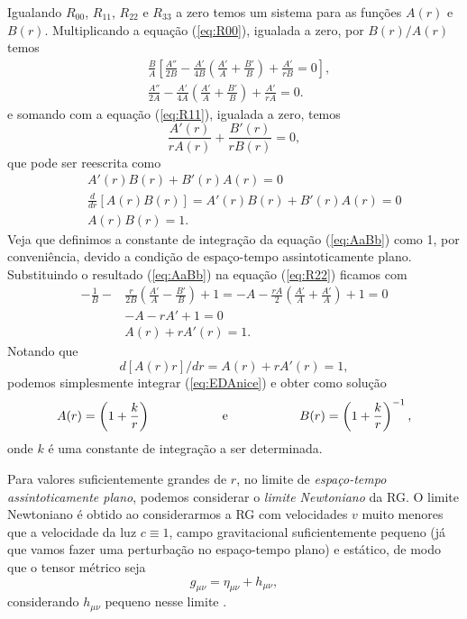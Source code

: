 \documentclass[12pt,a4paper,titlepage,brazil]{article}
\begin{document}
Igualando $R_{0 0}$, $R_{1 1}$, $R_{2 2}$ e $R_{3 3}$ a zero temos um sistema para as funções $A (r)$ e $B(r)$. Multiplicando a equação (\ref{eq:R00}), igualada a zero, por $B(r)/A(r)$ temos
\begin{align}
  & \frac{B}{A} \left[\frac{A''}{2 B} - \frac{A'}{4 B} \left( \frac{A'}{A} + \frac{B'}{B}\right) + \frac{A'}{r B} = 0 \right], \\
  & \frac{A''}{2 A} - \frac{A'}{4 A} \left( \frac{A'}{A} + \frac{B'}{B}\right) + \frac{A'}{r A} = 0 .
\end{align}  
e somando com a equação (\ref{eq:R11}), igualada a zero, temos
\begin{equation}
  \frac{A'(r)}{r A(r)} + \frac{B'(r)}{r B (r)} = 0 ,
\end{equation}
que pode ser reescrita como
\begin{eqnarray}
  & & A'(r) B(r) + B'(r) A(r) = 0 \nonumber\\
  & & \frac{d}{dr} \left[A(r) B(r)\right] = A'(r) B(r) + B'(r) A(r) = 0 \nonumber\\
  \label{eq:AaBb} & & A (r) B(r) = 1 .
\end{eqnarray}
Veja que definimos a constante de integração da equação (\ref{eq:AaBb}) como 1, por conveniência, devido a condição de espaço-tempo assintoticamente plano. Substituindo o resultado (\ref{eq:AaBb}) na equação (\ref{eq:R22}) ficamos com
\begin{align}
  - \frac{1}{B} - &\frac{r}{2 B} \left(\frac{A'}{A} - \frac{B'}{B}\right) + 1 = - A - \frac{r A}{2} \left(\frac{A'}{A} + \frac{A'}{A}\right) + 1 = 0\\
  & - A - r A' + 1 = 0\\
  & A(r) + r A' (r) = 1 . \label{eq:EDA}
\end{align}
Notando que
\begin{equation}
  d [A(r) r]/dr = A(r) + r A' (r) = 1 ,\label{eq:EDAnice}
\end{equation}
podemos simplesmente integrar (\ref{eq:EDAnice}) e obter como solução
\begin{equation}
  A (r) = \left( 1 + \frac{k}{r}\right) \hspace{2cm} \textnormal{e} \hspace{2cm} B(r) = \left( 1 + \frac{k}{r}\right)^{-1} ,
\end{equation}
onde $k$ é uma constante de integração a ser determinada.

Para valores suficientemente grandes de $r$, no limite de \emph{espaço-tempo assintoticamente plano}, podemos considerar o \emph{limite Newtoniano} da RG. O limite Newtoniano é obtido ao considerarmos a RG com velocidades $v$ muito menores que a velocidade da luz $c \equiv 1$, campo gravitacional suficientemente pequeno (já que vamos fazer uma perturbação no espaço-tempo plano) e estático, de modo que o tensor métrico seja
\begin{equation}
  g_{\mu \nu} = \eta_{\mu \nu} + h_{\mu \nu} ,
\end{equation}
considerando $h_{\mu \nu}$ pequeno nesse limite \cite{carroll2004, nightingale2006}.
\end{document}

